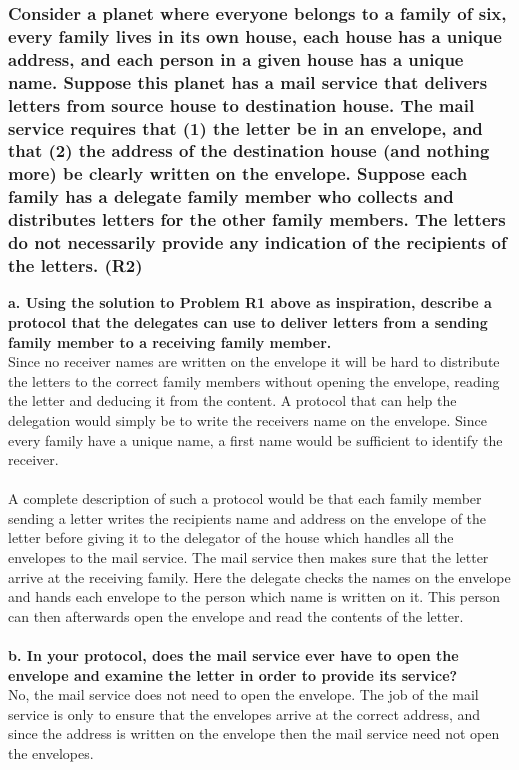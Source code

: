 \subsubsection{Consider a planet where everyone belongs to a family of six, every family lives in its own house, each house has a unique address, and each person in a given house has a unique name. Suppose this planet has a mail service that delivers letters from source house to destination house. The mail service requires that (1) the letter be in an envelope, and that (2) the address of the destination house (and nothing more) be clearly written on the envelope. Suppose each family has a delegate family member who collects and distributes letters for the other family members. The letters do not necessarily provide any indication of the recipients of the letters. (R2)}

\textbf{a. Using the solution to Problem R1 above as inspiration, describe a protocol that the delegates can use to deliver letters from a sending family member to a receiving family member.} \\
Since no receiver names are written on the envelope it will be hard to distribute the letters to the correct family members without opening the envelope, reading the letter and deducing it from the content. A protocol that can help the delegation would simply be to write the receivers name on the envelope. Since every family have a unique name, a first name would be sufficient to identify the receiver. \\
\\
A complete description of such a protocol would be that each family member sending a letter writes the recipients name and address on the envelope of the letter before giving it to the delegator of the house which handles all the envelopes to the mail service. The mail service then makes sure that the letter arrive at the receiving family. Here the delegate checks the names on the envelope and hands each envelope to the person which name is written on it. This person can then afterwards open the envelope and read the contents of the letter. \\
\\
\textbf{b. In your protocol, does the mail service ever have to open the envelope and examine the letter in order to provide its service?} \\
No, the mail service does not need to open the envelope. The job of the mail service is only to ensure that the envelopes arrive at the correct address, and since the address is written on the envelope then the mail service need not open the envelopes.